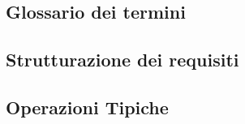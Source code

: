 \subsection{Glossario dei termini}


\subsection{Strutturazione dei requisiti}


\subsection{Operazioni Tipiche}




